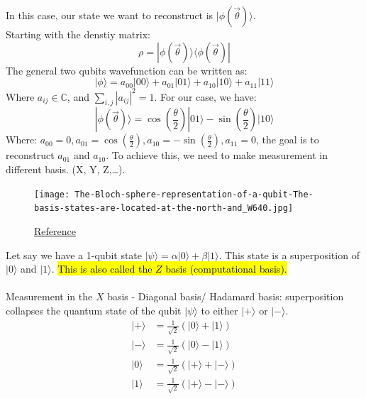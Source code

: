 \documentclass{article}
\begin{document}
In this case, our state we want to reconstruct is \(|\phi(\vec{\theta})\rangle\).
\\
Starting with the denstiy matrix:
\begin{equation*}
	\rho = |\phi(\vec{\theta})\rangle \langle \phi(\vec{\theta})|
\end{equation*}
The general two qubits wavefunction can be written as:
\begin{equation*}
	| \phi \rangle = a_{00} |00\rangle + a_{01} |01\rangle + a_{10} |10\rangle + a_{11} |11\rangle
\end{equation*}
Where \(a_{ij} \in \mathbb{C}\), and \(\sum_{i,j} |a_{ij}|^2 = 1\). For our case, we have:
\begin{equation*}
	| \phi(\vec{\theta}) \rangle = \cos\left(\frac{\theta}{2}\right) |01\rangle - \sin\left(\frac{\theta}{2}\right) |10\rangle
\end{equation*}
Where: \(a_{00} = 0, a_{01} =\cos\left(\frac{\theta}{2}\right) , a_{10} = -\sin\left(\frac{\theta}{2}\right), a_{11} = 0 \), the goal is to reconstruct
\(a_{01}\) and \(a_{10}\). To achieve this, we need to make measurement in different basis. (X, Y, Z,\dots).
\\
\begin{figure}[H]
	\centering
	\texttt{[image: The-Bloch-sphere-representation-of-a-qubit-The-basis-states-are-located-at-the-north-and\_W640.jpg]}
	\caption{\href{https://www.researchgate.net/publication/284259345_Quantum_optics_with_artificial_atoms/figures?lo=1}{Reference}}
\end{figure}
\noindent Let say we have a 1-qubit state \(| \psi \rangle = \alpha |0\rangle + \beta |1\rangle\). This state is a superposition of \(|0\rangle\) and \(|1\rangle\).\hl{ This is also called the $Z$ basis (computational basis).} \\ \\
Measurement in the $X$ basis - Diagonal basis/ Hadamard basis: superposition collapses the quantum state of the qubit \(|\psi\rangle\) to either \(|+\rangle\) or \(|-\rangle\).
\begin{align*}
	|+\rangle & = \frac{1}{\sqrt{2}}(|0\rangle + |1\rangle) \\
	|-\rangle & = \frac{1}{\sqrt{2}}(|0\rangle - |1\rangle) \\
	|0\rangle & = \frac{1}{\sqrt{2}}(|+\rangle + |-\rangle) \\
	|1\rangle & = \frac{1}{\sqrt{2}}(|+\rangle - |-\rangle) \\
\end{align*}
\end{document}
